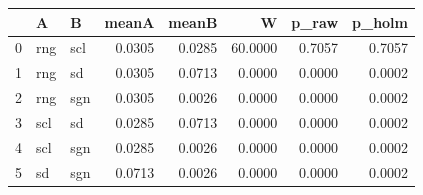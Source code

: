 \begin{tabular}{lllrrrrr}
\toprule
 & A & B & meanA & meanB & W & p_raw & p_holm \\
\midrule
0 & rng & scl & 0.0305 & 0.0285 & 60.0000 & 0.7057 & 0.7057 \\
1 & rng & sd & 0.0305 & 0.0713 & 0.0000 & 0.0000 & 0.0002 \\
2 & rng & sgn & 0.0305 & 0.0026 & 0.0000 & 0.0000 & 0.0002 \\
3 & scl & sd & 0.0285 & 0.0713 & 0.0000 & 0.0000 & 0.0002 \\
4 & scl & sgn & 0.0285 & 0.0026 & 0.0000 & 0.0000 & 0.0002 \\
5 & sd & sgn & 0.0713 & 0.0026 & 0.0000 & 0.0000 & 0.0002 \\
\bottomrule
\end{tabular}
